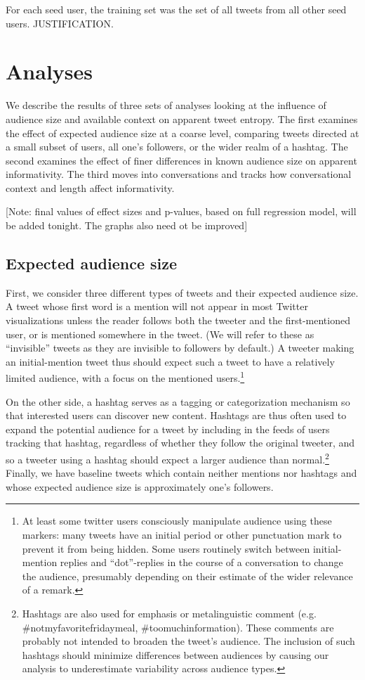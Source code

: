 \documentclass[11pt,letterpaper]{article}
\begin{document}
For each seed user, the training set was the set of all tweets from all other seed users.  JUSTIFICATION.

\section{Analyses}

We describe the results of three sets of analyses looking at the influence of audience size and available context on apparent tweet entropy. The first examines the effect of expected audience size at a coarse level, comparing tweets directed at a small subset of users, all one's followers, or the wider realm of a hashtag.   The second examines the effect of finer differences in known audience size on apparent informativity.  The third moves into conversations and tracks how conversational context and length affect informativity.

[Note: final values of effect sizes and p-values, based on full regression model, will be added tonight. The graphs also need ot be improved]

\subsection{Expected audience size}

First, we consider three different types of tweets and their expected audience size.  A tweet whose first word is a mention will not appear in most Twitter visualizations unless the reader follows both the tweeter and the first-mentioned user, or is mentioned somewhere in the tweet. (We will refer to these as ``invisible'' tweets as they are invisible to followers by default.)  A tweeter making an initial-mention tweet thus should expect such a tweet to have a relatively limited audience, with a focus on the mentioned users.\footnote{At least some twitter users consciously manipulate audience using these markers: many tweets have an initial period or other punctuation mark to prevent it from being hidden. Some users routinely switch between initial-mention replies and ``dot''-replies in the course of a conversation to change the audience, presumably depending on their estimate of the wider relevance of a remark.}

On the other side, a hashtag serves as a tagging or categorization mechanism so that interested users can discover new content. Hashtags are thus often used to expand the potential audience for a tweet by including in the feeds of users tracking that hashtag, regardless of whether they follow the original tweeter, and so a tweeter using a hashtag should expect a larger audience than normal.\footnote{Hashtags are also used for emphasis or metalinguistic comment (e.g. \#notmyfavoritefridaymeal, \#toomuchinformation). These comments are probably not intended to broaden the tweet's audience. The inclusion of such hashtags should minimize differences between audiences by causing our analysis to underestimate variability across audience types.}  Finally, we have baseline tweets which contain neither mentions nor hashtags and whose expected audience size is approximately one's followers.
\end{document}
